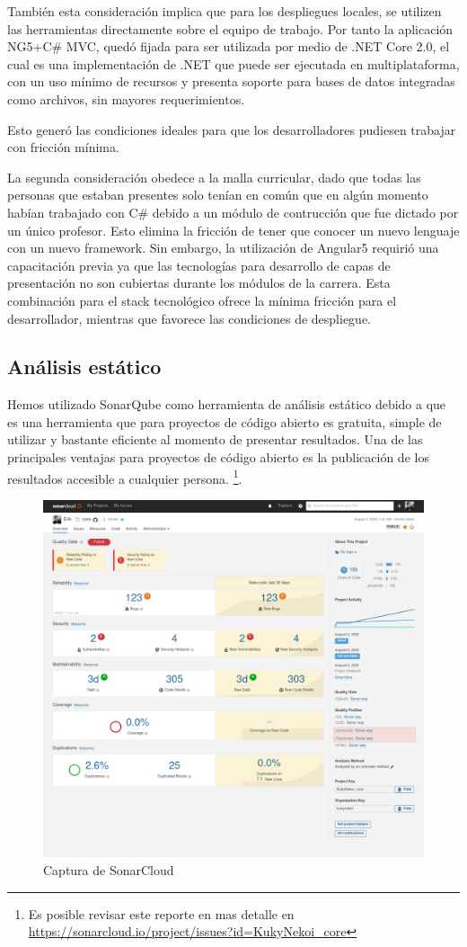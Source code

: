 También esta consideración implica que para los despliegues locales, se utilizen las herramientas directamente sobre el equipo de trabajo. Por tanto la aplicación NG5+C\# MVC, quedó fijada para ser utilizada por medio de .NET Core 2.0, el cual es una implementación de .NET que puede ser ejecutada en multiplataforma, con un uso mínimo de recursos y presenta soporte para bases de datos integradas como archivos, sin mayores requerimientos.

Esto generó las condiciones ideales para que los desarrolladores pudiesen trabajar con fricción mínima.

La segunda consideración obedece a la malla curricular, dado que todas las personas que estaban presentes solo tenían en común que en algún momento habían trabajado con C\# debido a un módulo de contrucción que fue dictado por un único profesor. Esto elimina la fricción de tener que conocer un nuevo lenguaje con un nuevo framework. Sin embargo, la utilización de Angular5 requirió una capacitación previa ya que las tecnologías para desarrollo de capas de presentación no son cubiertas durante los módulos de la carrera. Esta combinación para el stack tecnológico ofrece la mínima fricción para el desarrollador, mientras que favorece las condiciones de despliegue.

\subsection{Análisis estático}

Hemos utilizado SonarQube como herramienta de análisis estático debido a que es una herramienta que para proyectos de código abierto es gratuita, simple de utilizar y bastante eficiente al momento de presentar resultados. Una de las principales ventajas para proyectos de código abierto es la publicación de los resultados accesible a cualquier persona. \footnote{Es posible revisar este reporte en mas detalle en \url{https://sonarcloud.io/project/issues?id=KukyNekoi_core}}.


\begin{figure}
	\centering
	\includegraphics[width=.9\textwidth]{fragments/sonarqube.png}
	\caption{Captura de SonarCloud  }
\end{figure}


